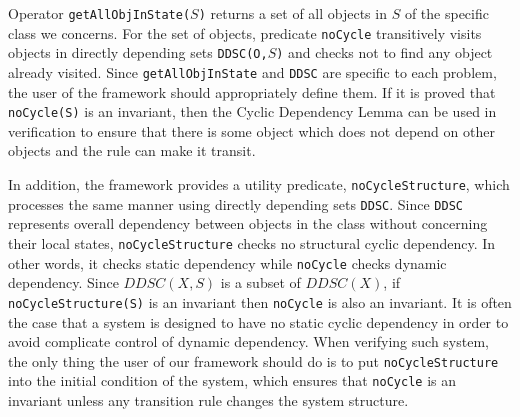 \documentclass[12pt]{report}
\newcommand{\stt}[1]{{\small{\tt {#1}}}}
\begin{document}
Operator \stt{getAllObjInState($S$)} returns a set of all objects in
$S$ of the specific class we concerns. For the set of objects,
predicate {\tt noCycle} transitively visits objects in directly
depending sets \stt{DDSC(O,$S$)} and checks not to find any object
already visited. Since {\tt getAllObjInState} and {\tt DDSC} are
specific to each problem, the user of the framework should
appropriately define them. If it is proved that \stt{noCycle(S)} is an
invariant, then the Cyclic Dependency Lemma can be used in
verification to ensure that there is some object which does not depend
on other objects and the rule can make it transit.

In addition, the framework provides a utility predicate,
{\tt noCycleStructure}, which processes the same manner using directly
depending sets {\tt DDSC}. Since {\tt DDSC} represents overall
dependency between objects in the class without concerning their local
states, {\tt noCycleStructure} checks no structural cyclic dependency.
In other words, it checks static dependency while {\tt noCycle} checks
dynamic dependency. Since $DDSC(X,S)$ is a subset of $DDSC(X)$,
if \stt{noCycleStructure(S)} is an invariant then {\tt noCycle} is also
an invariant. It is often the case that a system is designed to
have no static cyclic dependency in order to avoid complicate control
of dynamic dependency. When verifying such system, the only thing
the user of our framework should do is to put {\tt noCycleStructure} into
the initial condition of the system, which ensures that {\tt noCycle}
is an invariant unless any transition rule changes the system structure.
\end{document}
